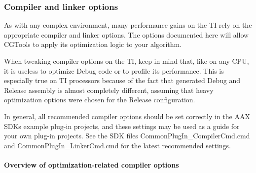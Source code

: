 \hypertarget{a00362_subsection__compiler_and_linker_options}{}\subsubsection{Compiler and linker options}\label{a00362_subsection__compiler_and_linker_options}
As with any complex environment, many performance gains on the T\+I rely on the appropriate compiler and linker options. The options documented here will allow C\+G\+Tools to apply its optimization logic to your algorithm.

When tweaking compiler options on the T\+I, keep in mind that, like on any C\+P\+U, it is useless to optimize Debug code or to profile its performance. This is especially true on T\+I processors because of the fact that generated Debug and Release assembly is almost completely different, assuming that heavy optimization options were chosen for the Release configuration.

In general, all recommended compiler options should be set correctly in the A\+A\+X S\+D\+K\textquotesingle{}s example plug-\/in projects, and these settings may be used as a guide for your own plug-\/in projects. See the S\+D\+K files Common\+Plug\+In\+\_\+\+Compiler\+Cmd.\+cmd and Common\+Plug\+In\+\_\+\+Linker\+Cmd.\+cmd for the latest recommended settings.

\hypertarget{a00362_subsubsection__overview_of_optimizationrelated_compiler_options_}{}\paragraph{Overview of optimization-\/related compiler options}\label{a00362_subsubsection__overview_of_optimizationrelated_compiler_options_}
 
